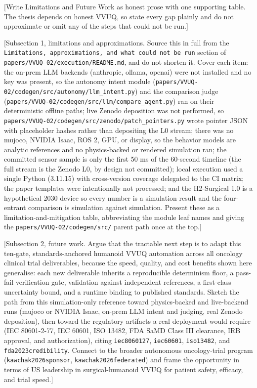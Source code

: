 
[Write Limitations and Future Work as honest prose with one supporting table. The
thesis depends on honest VVUQ, so state every gap plainly and do not approximate or
omit any of the steps that could not be run.]

[Subsection 1, limitations and approximations. Source this in full from the
\texttt{Limitations, approximations, and what could not be run} section of
\texttt{papers/VVUQ-02/execution/README.md}, and do not shorten it. Cover each
item: the on-prem LLM backends (anthropic, ollama, openai) were not installed and
no key was present, so the autonomy intent module
(\texttt{papers/VVUQ-02/codegen/src/autonomy/llm\_intent.py}) and the comparison
judge (\texttt{papers/VVUQ-02/codegen/src/llm/compare\_agent.py}) ran on their
deterministic offline paths; live Zenodo deposition was not performed, so
\texttt{papers/VVUQ-02/codegen/src/zenodo/patch\_pointers.py} wrote pointer JSON
with placeholder hashes rather than depositing the L0 stream; there was no mujoco,
NVIDIA Isaac, ROS 2, GPU, or display, so the behavior models are analytic
references and no physics-backed or rendered simulation ran; the committed sensor
sample is only the first 50 ms of the 60-second timeline (the full stream is the
Zenodo L0, by design not committed); local execution used a single Python (3.11.15)
with cross-version coverage delegated to the CI matrix; the paper templates were
intentionally not processed; and the H2-Surgical 1.0 is a hypothetical 2030 device
so every number is a simulation result and the four-entrant comparison is
simulation against simulation. Present these as a limitation-and-mitigation table,
abbreviating the module leaf names and giving the
\texttt{papers/VVUQ-02/codegen/src/} parent path once at the top.]

[Subsection 2, future work. Argue that the tractable next step is to adapt this
ten-gate, standards-anchored humanoid VVUQ automation across all oncology clinical
trial deliverables, because the speed, quality, and cost benefits shown here
generalise: each new deliverable inherits a reproducible determinism floor, a
pass-fail verification gate, validation against independent references, a
first-class uncertainty bound, and a runtime binding to published standards.
Sketch the path from this simulation-only reference toward physics-backed and
live-backend runs (mujoco or NVIDIA Isaac, on-prem LLM intent and judging, real
Zenodo deposition), then toward the regulatory artifacts a real deployment would
require (IEC 80601-2-77, IEC 60601, ISO 13482, FDA SaMD Class III clearance, IRB
approval, and authorization), citing \texttt{iec8060127}, \texttt{iec60601},
\texttt{iso13482}, and \texttt{fda2023credibility}. Connect to the broader
autonomous oncology-trial program (\texttt{kawchak2026sponsor},
\texttt{kawchak2026federated}) and frame the opportunity in terms of US leadership
in surgical-humanoid VVUQ for patient safety, efficacy, and trial speed.]

